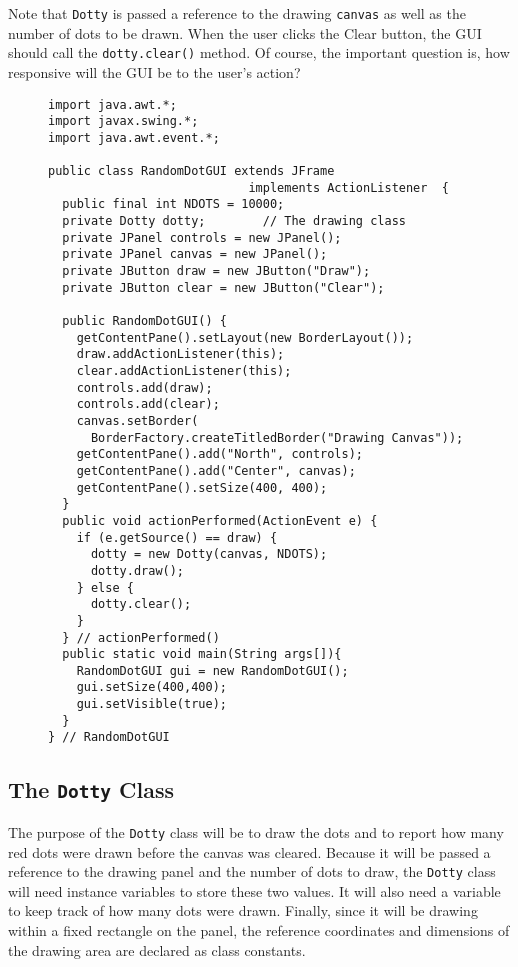 \noindent Note that {\tt Dotty} is passed a reference to the drawing
{\tt canvas} as well as the number of dots to be drawn.   When the user
clicks the Clear button, the GUI should call the {\tt dotty.clear()}
method.  Of course, the important question is, how responsive will
the GUI be to the user's action?


\begin{figure}[h!]
\jjjprogstart
\begin{jjjlisting}
\begin{lstlisting}
import java.awt.*;
import javax.swing.*;
import java.awt.event.*;

public class RandomDotGUI extends JFrame 
                            implements ActionListener  {
  public final int NDOTS = 10000;
  private Dotty dotty;        // The drawing class
  private JPanel controls = new JPanel();
  private JPanel canvas = new JPanel();
  private JButton draw = new JButton("Draw");
  private JButton clear = new JButton("Clear");
 	
  public RandomDotGUI() {
    getContentPane().setLayout(new BorderLayout());
    draw.addActionListener(this);
    clear.addActionListener(this);
    controls.add(draw);
    controls.add(clear);
    canvas.setBorder(
      BorderFactory.createTitledBorder("Drawing Canvas"));
    getContentPane().add("North", controls);
    getContentPane().add("Center", canvas);
    getContentPane().setSize(400, 400);
  } 
  public void actionPerformed(ActionEvent e) {
    if (e.getSource() == draw) {
      dotty = new Dotty(canvas, NDOTS);
      dotty.draw();
    } else {
      dotty.clear();
    }
  } // actionPerformed()
  public static void main(String args[]){
    RandomDotGUI gui = new RandomDotGUI();
    gui.setSize(400,400);
    gui.setVisible(true);        
  }
} // RandomDotGUI
\end{lstlisting}
\end{jjjlisting}
\end{figure}

\subsection*{The {\tt Dotty} Class}

\noindent The purpose of the {\tt Dotty} class will be to draw the
dots and to report how many red dots were drawn before the canvas was
cleared.  Because it will be passed a reference to the drawing panel
and the number of dots to draw, the {\tt Dotty} class will need
instance variables to store these two values.  It will also need a
variable to keep track of how many
dots were drawn.  Finally, since it will be drawing within a fixed
rectangle on the panel, the reference coordinates and dimensions
of the drawing area are declared as class constants. 

